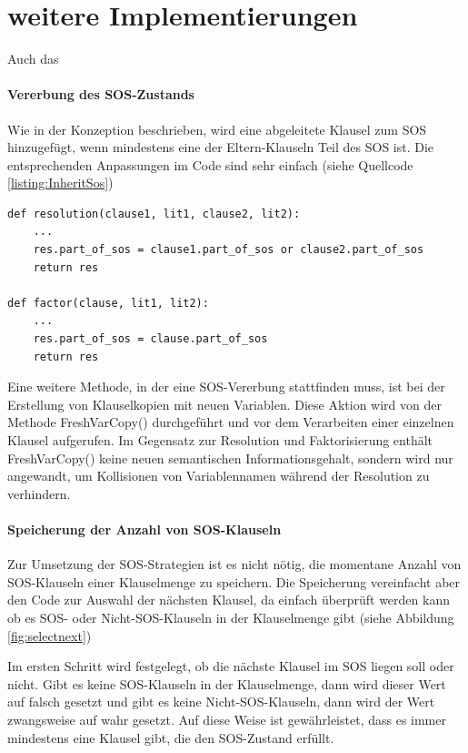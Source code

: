 \section{weitere Implementierungen}

Auch das 

\paragraph{Vererbung des SOS-Zustands}
Wie in der Konzeption beschrieben, wird eine abgeleitete Klausel zum SOS hinzugefügt, wenn mindestens eine der Eltern-Klauseln Teil des SOS ist. Die entsprechenden Anpassungen im Code sind sehr einfach (siehe Quellcode \ref{listing:InheritSos})
\begin{lstlisting}[caption={Implementierung der Vererbung des SOS.Zustands an abgeleitee Klauseln}label={listing:InheritSos}]
def resolution(clause1, lit1, clause2, lit2):
	...
	res.part_of_sos = clause1.part_of_sos or clause2.part_of_sos
	return res
	
def factor(clause, lit1, lit2):
	...
	res.part_of_sos = clause.part_of_sos
	return res
\end{lstlisting}
Eine weitere Methode, in der eine SOS-Vererbung stattfinden muss, ist bei der Erstellung von Klauselkopien mit neuen Variablen. Diese Aktion wird von der Methode FreshVarCopy() durchgeführt und vor dem Verarbeiten einer einzelnen Klausel aufgerufen.
Im Gegensatz zur Resolution und Faktorisierung enthält FreshVarCopy() keine neuen semantischen Informationsgehalt, sondern wird nur angewandt, um Kollisionen von Variablennamen während der Resolution zu verhindern.


\paragraph{Speicherung der Anzahl von SOS-Klauseln}
Zur Umsetzung der SOS-Strategien ist es nicht nötig, die momentane Anzahl von SOS-Klauseln einer Klauselmenge zu speichern. Die Speicherung vereinfacht aber den Code zur Auswahl der nächsten Klausel, da einfach überprüft werden kann ob es SOS- oder Nicht-SOS-Klauseln in der Klauselmenge gibt (siehe Abbildung \ref{fig:selectnext})

Im ersten Schritt wird festgelegt, ob die nächste Klausel im SOS liegen soll oder nicht. Gibt es keine SOS-Klauseln in der Klauselmenge, dann wird dieser Wert auf falsch gesetzt und gibt es keine Nicht-SOS-Klauseln, dann wird der Wert zwangsweise auf wahr gesetzt. Auf diese Weise ist gewährleistet, dass es immer mindestens eine Klausel gibt, die den SOS-Zustand erfüllt. 

